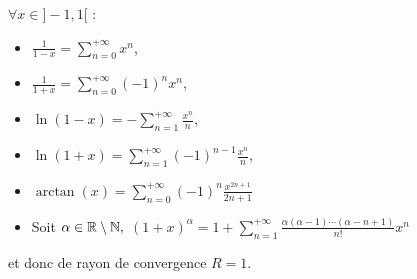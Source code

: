 \begin{proposition}{}{}
    $\forall x \in ]-1, 1[$ : 
    \begin{itemize}
        \item $\displaystyle \frac 1 {1 - x} = \sum_{n = 0}^{+\infty} x^n$,
        \item $\displaystyle \frac 1 { 1 + x} = \sum_{n = 0}^{+\infty} (-1)^n x^n$,
        \item $\displaystyle \ln(1 - x) = - \sum_{n = 1}^{+\infty} \frac{x^n}{n}$,
        \item $\displaystyle \ln(1 + x) = \sum_{n = 1}^{+\infty} (-1)^{n - 1} \frac{x^n}{n}$,
        \item $\displaystyle \arctan(x) = \sum_{n = 0}^{+\infty} (-1)^n \frac{x^{2n + 1}}{2n + 1}$
        \item Soit $\alpha \in \mathbb{R} \setminus \mathbb{N}, $
        $\displaystyle (1 + x)^\alpha =  1 + \sum_{n = 1}^{+\infty} \frac{\alpha (\alpha - 1) \cdots (\alpha - n + 1)}{n! } x^n$
    \end{itemize}
    et donc de rayon de convergence $R = 1$.
\end{proposition}

